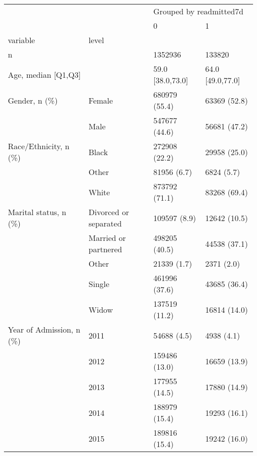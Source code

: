 \begin{tabular}{llll}
\toprule
                                       &   & \multicolumn{2}{l}{Grouped by readmitted7d} \\
                                       &   &                       0 &                 1 \\
variable & level &                         &                   \\
\midrule
n &   &                 1352936 &            133820 \\
Age, median [Q1,Q3] &   &        59.0 [38.0,73.0] &  64.0 [49.0,77.0] \\
Gender, n (\%) & Female &           680979 (55.4) &      63369 (52.8) \\
                                       & Male &           547677 (44.6) &      56681 (47.2) \\
Race/Ethnicity, n (\%) & Black &           272908 (22.2) &      29958 (25.0) \\
                                       & Other &             81956 (6.7) &        6824 (5.7) \\
                                       & White &           873792 (71.1) &      83268 (69.4) \\
Marital status, n (\%) & Divorced or separated &            109597 (8.9) &      12642 (10.5) \\
                                       & Married or partnered &           498205 (40.5) &      44538 (37.1) \\
                                       & Other &             21339 (1.7) &        2371 (2.0) \\
                                       & Single &           461996 (37.6) &      43685 (36.4) \\
                                       & Widow &           137519 (11.2) &      16814 (14.0) \\
Year of Admission, n (\%) & 2011 &             54688 (4.5) &        4938 (4.1) \\
                                       & 2012 &           159486 (13.0) &      16659 (13.9) \\
                                       & 2013 &           177955 (14.5) &      17880 (14.9) \\
                                       & 2014 &           188979 (15.4) &      19293 (16.1) \\
                                       & 2015 &           189816 (15.4) &      19242 (16.0) \\

\end{tabular}
